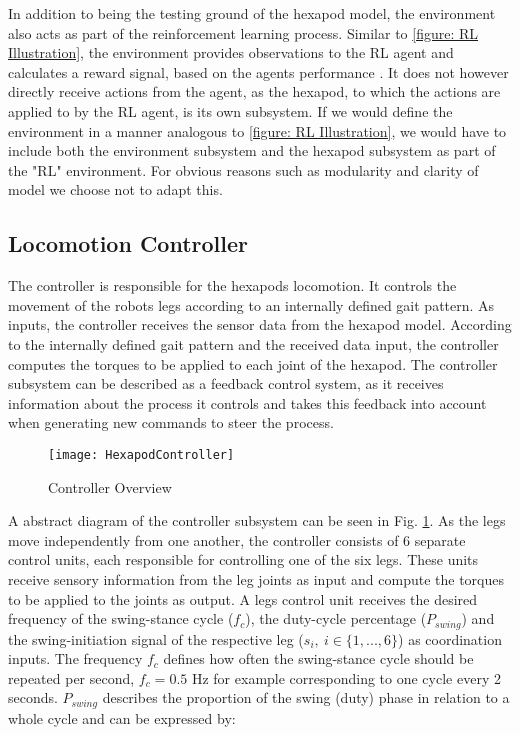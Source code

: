 In addition to being the testing ground of the hexapod model, the environment also acts as part of the reinforcement learning process.
Similar to \ref{figure: RL Illustration}, the environment provides observations to the RL agent and calculates a reward signal, based on the agents performance .
It does not however directly receive actions from the agent, as the hexapod, to which the actions are applied to by the RL agent, is its own subsystem.
If we would define the environment in a manner analogous to \ref{figure: RL Illustration}, we would have to include both the environment subsystem and the hexapod subsystem as part of the "RL" environment.
For obvious reasons such as modularity and clarity of model we choose not to adapt this.

\subsection{Locomotion Controller} \label{subsec: Locomotion controller}
The controller is responsible for the hexapods locomotion.
It controls the movement of the robots legs according to an internally defined gait pattern.
As inputs, the controller receives the sensor data from the hexapod model.
According to the internally defined gait pattern and the received data input, the controller computes the torques to be applied to each joint of the hexapod.
The controller subsystem can be described as a feedback control system, as it receives information about the process it controls and takes this feedback into account when generating new commands to steer the process.

\begin{figure}
	\centerline{\texttt{[image: HexapodController]}}
	\caption{Controller Overview}
	\label{figure: Controller Overview}
\end{figure}

A abstract diagram of the controller subsystem can be seen in Fig. \ref{figure: Controller Overview}.
As the legs move independently from one another, the controller consists of 6 separate control units, each responsible for controlling one of the six legs.
These units receive sensory information from the leg joints as input and compute the torques to be applied to the joints as output.
A legs control unit receives the desired frequency of the swing-stance cycle ($f_{c}$), the duty-cycle percentage ($P_{swing}$) and the swing-initiation signal of the respective leg ($s_i,\ i \in \{1,...,6\}$) as coordination inputs.
The frequency $f_{c}$ defines how often the swing-stance cycle should be repeated per second, $f_{c} = 0.5 \text{ Hz}$ for example corresponding to one cycle every 2 seconds.
$P_{swing}$ describes the proportion of the swing (duty) phase in relation to a whole cycle \parencite{qiu2023adaptive} and can be expressed by: 

